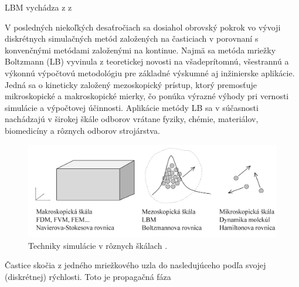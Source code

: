 \documentclass[]{tukediphc}
\begin{document}
LBM vychádza z z 


V posledných niekoľkých desaťročiach sa dosiahol obrovský pokrok vo vývoji diskrétnych simulačných metód založených na časticiach v porovnaní s konvenčnými metódami založenými na kontinue. Najmä sa metóda mriežky Boltzmann (LB) vyvinula z teoretickej novosti na všadeprítomnú, všestrannú a výkonnú výpočtovú metodológiu pre základné výskumné aj inžinierske aplikácie. Jedná sa o kineticky založený mezoskopický prístup, ktorý premosťuje mikroskopické a makroskopické mierky, čo ponúka výrazné výhody pri vernosti simulácie a výpočtovej účinnosti. Aplikácie metódy LB sa v súčasnosti nachádzajú v širokej škále odborov vrátane fyziky, chémie, materiálov, biomedicíny a rôznych odborov strojárstva.

\begin{figure}[!ht]
	\centering
	\includegraphics[width=1\textwidth,angle=0]{figures/different-scales.png}
	\caption{Techniky simulácie v rôznych škálach \citep{Mele2013}.}
\end{figure}

Častice skočia z jedného mriežkového uzla do nasledujúceho podľa svojej (diskrétnej) rýchlosti. Toto je propagačná fáza
\end{document}
